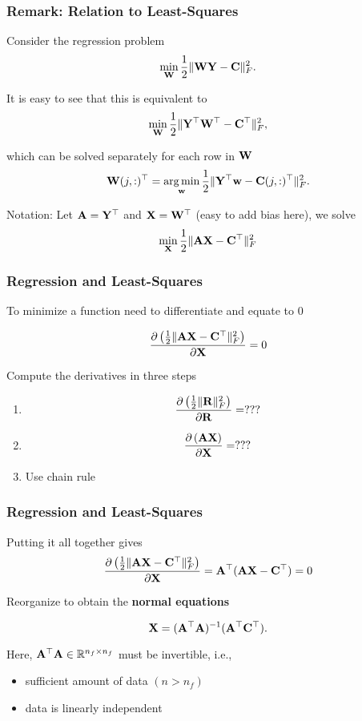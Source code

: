 \documentclass[12pt,fleqn,beamer]{beamer}
\begin{document}
\begin{frame}
	\frametitle{Remark: Relation to Least-Squares}
	
	Consider the regression problem
	$$ \min_{{\bf W}} {\frac 12} \|{\bf W} {\bf Y} - {\bf C}\|^2_F. $$
	
	It is easy to see that this is equivalent to
	$$ \min_{{\bf W}} {\frac 12} \| {\bf Y}^\top {\bf W}^\top - {\bf C}^\top\|^2_F, $$
	
	which can be solved separately for each row in ${\bf W}$
	$$
	{\bf W}(j,:)^\top = \operatorname*{arg\,min}_{{\bf w}} {\frac 12} \| {\bf Y}^\top {\bf w} - {\bf C}(j,:)^\top\|^2_F.
	$$
	
	Notation: Let ${\bf A} = {\bf Y}^\top$ and ${\bf X} = {\bf W}^\top$ (easy to add bias here), we solve
	$$
		\min_{\bf X} {\frac 12} \| {\bf A} {\bf X} - {\bf C}^\top \|^2_F
	$$
		
\end{frame}

\begin{frame}\frametitle{Regression and Least-Squares}

To minimize a function need to differentiate and equate to $0$

$$ {\frac {\partial \left( {\frac 12} \|{\bf A}{\bf X} - {\bf C}^\top\|^2_F \right)}{\partial {\bf X}}} = 0 $$

Compute the derivatives in three steps


\begin{enumerate}
\item $$ {\frac {\partial \left( {\frac 12} \|{\bf R} \|^2_F \right)}{\partial {\bf R}}} = ??? $$

\item $$ {\frac {\partial \left( {\bf A} {\bf X} \right)}{\partial {\bf X}}} = ??? $$

\item Use chain rule

\end{enumerate}


\end{frame}

\begin{frame}\frametitle{Regression and Least-Squares}

Putting it all together gives
$$ {\frac {\partial \left( {\frac 12} \|{\bf A}{\bf X} - {\bf C}^\top\|^2_F \right)}{\partial {\bf X}}} = 
{\bf A}^\top({\bf A} {\bf X} - {\bf C}^\top)=0 $$

Reorganize to obtain the {\bf normal equations}

$$ {\bf X} =  ({\bf A}^\top {\bf A})^{-1}({\bf A}^\top {\bf C}^\top). $$

Here, ${\bf A}^\top {\bf A} \in \mathbb{R}^{n_f \times n_f}$ must be invertible, i.e., 
\begin{itemize}
\item sufficient amount of data $(n>n_f)$
\item data is linearly independent
\end{itemize}

\end{frame}
\end{document}
